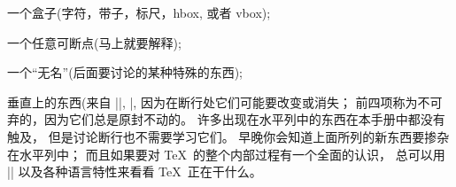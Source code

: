 \smallskip
\item\bull 一个盒子(字符，带子，标尺，hbox, 或者 vbox);

\item\bull 一个任意可断点(马上就要解释);

\item\bull 一个``无名''(后面要讨论的某种特殊的东西);

\item\bull 垂直上的东西(来自 |\mark|, |,
因为在断行处它们可能要改变或消失；
前四项称为不可弃的，因为它们总是原封不动的。%
许多出现在水平列中的东西在本手册中都没有触及，
但是讨论断行也不需要学习它们。%
早晚你会知道上面所列的新东西要掺杂在水平列中；
而且如果要对 \TeX\ 的整个内部过程有一个全面的认识，
总可以用 |\showlists| 以及各种语言特性来看看 \TeX\ 正在干什么。

